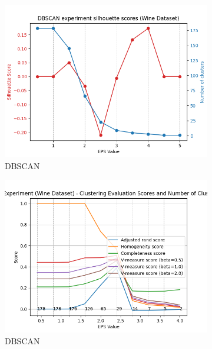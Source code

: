\documentclass[12pt]{article}
\begin{document}
\begin{figure}[H]
\begin{subfigure}[t]{0.19\textwidth}
        \includegraphics[width=\linewidth]{img/other_datasets/wine_dbscan_silhouette.png}
        \caption{DBSCAN}
    \end{subfigure}
    \hfill
    \begin{subfigure}[t]{0.19\textwidth}
        \includegraphics[width=\linewidth]{img/other_datasets/wine_dbscan_scores.png}
        \caption{DBSCAN}
    \end{subfigure}
    \hfill
    \begin{subfigure}[t]{0.19\textwidth}

\end{subfigure}
\end{figure}
\end{document}
